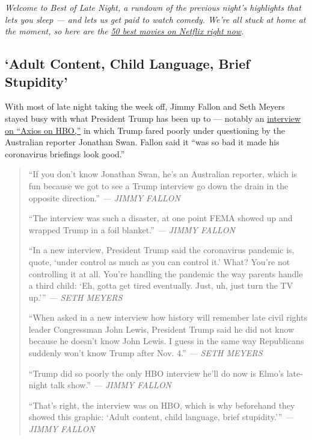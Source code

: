 \emph{Welcome to Best of Late Night, a rundown of the previous night's
highlights that lets you sleep --- and lets us get paid to watch comedy.
We're all stuck at home at the moment, so here are the}
\href{https://www.nytimes3xbfgragh.onion/interactive/2020/arts/television/best-movies-on-netflix.html}{\emph{50
best movies on Netflix right now}}\emph{.}

\hypertarget{adult-content-child-language-brief-stupidity}{%
\subsection{`Adult Content, Child Language, Brief
Stupidity'}\label{adult-content-child-language-brief-stupidity}}

With most of late night taking the week off, Jimmy Fallon and Seth
Meyers stayed busy with what President Trump has been up to --- notably
an
\href{https://www.nytimes3xbfgragh.onion/2020/08/04/us/politics/trump-john-lewis-axios.html}{interview
on ``Axios on HBO,''} in which Trump fared poorly under questioning by
the Australian reporter Jonathan Swan. Fallon said it ``was so bad it
made his coronavirus briefings look good.''

\begin{quote}
``If you don't know Jonathan Swan, he's an Australian reporter, which is
fun because we got to see a Trump interview go down the drain in the
opposite direction.'' \emph{--- JIMMY FALLON}

``The interview was such a disaster, at one point FEMA showed up and
wrapped Trump in a foil blanket.'' \emph{--- JIMMY FALLON}

``In a new interview, President Trump said the coronavirus pandemic is,
quote, `under control as much as you can control it.' What? You're not
controlling it at all. You're handling the pandemic the way parents
handle a third child: `Eh, gotta get tired eventually. Just, uh, just
turn the TV up.''' \emph{--- SETH MEYERS}

``When asked in a new interview how history will remember late civil
rights leader Congressman John Lewis, President Trump said he did not
know because he doesn't know John Lewis. I guess in the same way
Republicans suddenly won't know Trump after Nov. 4.'' \emph{--- SETH
MEYERS}

``Trump did so poorly the only HBO interview he'll do now is Elmo's
late-night talk show.'' \emph{--- JIMMY FALLON}

``That's right, the interview was on HBO, which is why beforehand they
showed this graphic: `Adult content, child language, brief stupidity.'''
\emph{--- JIMMY FALLON}
\end{quote}

